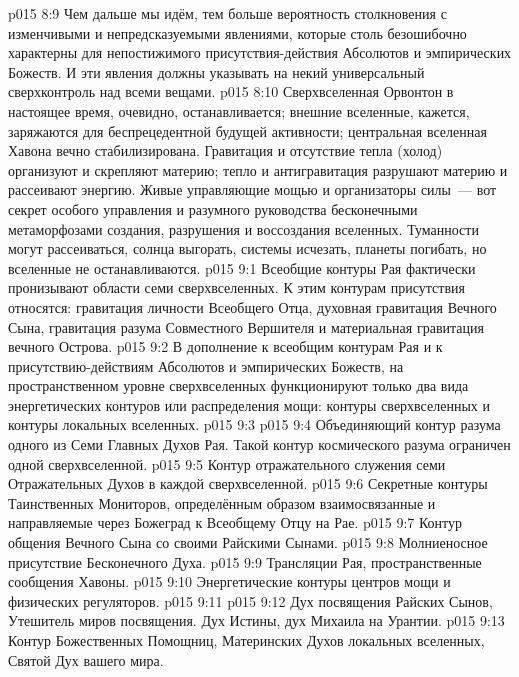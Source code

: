 \vs p015 8:9 Чем дальше мы идём, тем больше вероятность столкновения с изменчивыми и непредсказуемыми явлениями, которые столь безошибочно характерны для непостижимого присутствия\hyp{}действия Абсолютов и эмпирических Божеств. И эти явления должны указывать на некий универсальный сверхконтроль над всеми вещами.
\vs p015 8:10 Сверхвселенная Орвонтон в настоящее время, очевидно, останавливается; внешние вселенные, кажется, заряжаются для беспрецедентной будущей активности; центральная вселенная Хавона вечно стабилизирована. Гравитация и отсутствие тепла (холод) организуют и скрепляют материю; тепло и антигравитация разрушают материю и рассеивают энергию. Живые управляющие мощью и организаторы силы~--- вот секрет особого управления и разумного руководства бесконечными метаморфозами создания, разрушения и воссоздания вселенных. Туманности могут рассеиваться, солнца выгорать, системы исчезать, планеты погибать, но вселенные не останавливаются.
\vs p015 9:1 Всеобщие контуры Рая фактически пронизывают области семи сверхвселенных. К этим контурам присутствия относятся: гравитация личности Всеобщего Отца, духовная гравитация Вечного Сына, гравитация разума Совместного Вершителя и материальная гравитация вечного Острова.
\vs p015 9:2 В дополнение к всеобщим контурам Рая и к присутствию\hyp{}действиям Абсолютов и эмпирических Божеств, на пространственном уровне сверхвселенных функционируют только два вида энергетических контуров или распределения мощи: контуры сверхвселенных и контуры локальных вселенных.
\vs p015 9:3 \pc {}
\vs p015 9:4 Объединяющий контур разума одного из Семи Главных Духов Рая. Такой контур космического разума ограничен одной сверхвселенной.
\vs p015 9:5 Контур отражательного служения семи Отражательных Духов в каждой сверхвселенной.
\vs p015 9:6 Секретные контуры Таинственных Мониторов, определённым образом взаимосвязанные и направляемые через Божеград к Всеобщему Отцу на Рае.
\vs p015 9:7 Контур общения Вечного Сына со своими Райскими Сынами.
\vs p015 9:8 Молниеносное присутствие Бесконечного Духа.
\vs p015 9:9 Трансляции Рая, пространственные сообщения Хавоны.
\vs p015 9:10 Энергетические контуры центров мощи и физических регуляторов.
\vs p015 9:11 \pc {}
\vs p015 9:12 Дух посвящения Райских Сынов, Утешитель миров посвящения. Дух Истины, дух Михаила на Урантии.
\vs p015 9:13 Контур Божественных Помощниц, Материнских Духов локальных вселенных, Святой Дух вашего мира.
